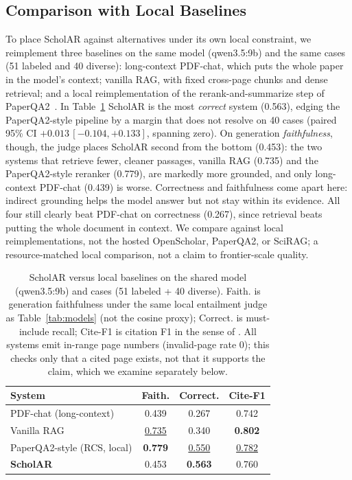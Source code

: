 \documentclass[letterpaper]{article} %
\newcommand{\best}[1]{\textbf{#1}}
\newcommand{\snd}[1]{\underline{#1}}
\begin{document}
\subsection{Comparison with Local Baselines}
\label{sec:auto-compare}
To place ScholAR against alternatives under its own local constraint, we reimplement
three baselines on the same model (qwen3.5:9b) and the same cases (51 labeled and 40
diverse): long-context PDF-chat, which puts the whole paper in the model's context;
vanilla RAG, with fixed cross-page chunks and dense retrieval; and a local
reimplementation of the rerank-and-summarize step of PaperQA2~\citep{lala2024paperqa2}.
In Table~\ref{tab:compare} ScholAR is the most \emph{correct} system (0.563), edging the
PaperQA2-style pipeline by a margin that does not resolve on 40 cases (paired 95\% CI
$+0.013\,[-0.104,+0.133]$, spanning zero). On generation \emph{faithfulness}, though, the judge
places ScholAR second from the bottom (0.453): the two systems that retrieve fewer, cleaner
passages, vanilla RAG (0.735) and the PaperQA2-style reranker (0.779), are markedly more grounded,
and only long-context PDF-chat (0.439) is worse. Correctness and faithfulness come apart here:
indirect grounding helps the model answer but not stay within its evidence. All four still
clearly beat PDF-chat on correctness (0.267), since retrieval beats putting the whole document in context. We compare
against local reimplementations, not the hosted OpenScholar, PaperQA2, or SciRAG; a resource-matched
local comparison, not a claim to frontier-scale quality.

\begin{table}[t]
  \centering
  \caption{ScholAR versus local baselines on the shared model (qwen3.5:9b) and cases
           (51 labeled + 40 diverse). Faith. is generation faithfulness under the same local
           entailment judge as Table~\ref{tab:models} (not the cosine proxy); Correct. is
           must-include recall; Cite-F1 is citation F1 in the sense of
           \citet{gao2023attributing}. All systems emit in-range page numbers
           (invalid-page rate 0); this checks only that a cited page exists, not that it
           supports the claim, which we examine separately below.}
  \label{tab:compare}
  \setlength{\tabcolsep}{3pt}
  \begin{tabular}{lccc}
    \toprule
    \textbf{System} & \textbf{Faith.} & \textbf{Correct.} & \textbf{Cite-F1} \\
    \midrule
    PDF-chat (long-context)      & 0.439 & 0.267 & 0.742 \\
    Vanilla RAG                  & \snd{0.735} & 0.340 & \best{0.802} \\
    PaperQA2-style (RCS, local)  & \best{0.779} & \snd{0.550} & \snd{0.782} \\
    \textbf{ScholAR}             & 0.453 & \best{0.563} & 0.760 \\
    \bottomrule
  \end{tabular}
\end{table}
\end{document}
